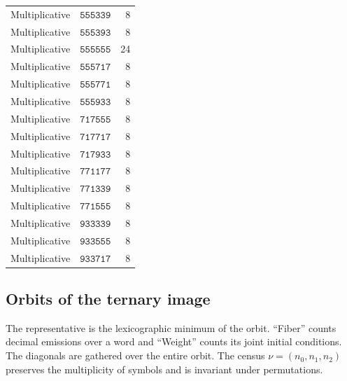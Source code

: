 \begin{longtable}{@{}llr@{}}
Multiplicative&\(\mathtt{555339}\)&8\\
Multiplicative&\(\mathtt{555393}\)&8\\
Multiplicative&\(\mathtt{555555}\)&24\\
Multiplicative&\(\mathtt{555717}\)&8\\
Multiplicative&\(\mathtt{555771}\)&8\\
Multiplicative&\(\mathtt{555933}\)&8\\
Multiplicative&\(\mathtt{717555}\)&8\\
Multiplicative&\(\mathtt{717717}\)&8\\
Multiplicative&\(\mathtt{717933}\)&8\\
Multiplicative&\(\mathtt{771177}\)&8\\
Multiplicative&\(\mathtt{771339}\)&8\\
Multiplicative&\(\mathtt{771555}\)&8\\
Multiplicative&\(\mathtt{933339}\)&8\\
Multiplicative&\(\mathtt{933555}\)&8\\
Multiplicative&\(\mathtt{933717}\)&8\\
\bottomrule
\end{longtable}



\subsection{Orbits of the ternary image}
The representative is the lexicographic minimum of the orbit. “Fiber”
counts decimal emissions over a word and “Weight” counts its
joint initial conditions. The diagonals are gathered over
the entire orbit. The census \(\nu=(n_0,n_1,n_2)\) preserves the
multiplicity of symbols and is invariant under permutations.

